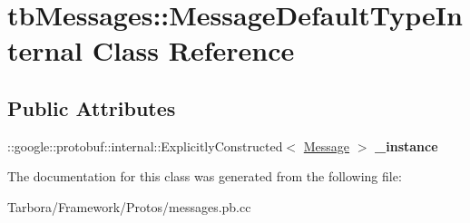 \hypertarget{classtbMessages_1_1MessageDefaultTypeInternal}{}\section{tb\+Messages\+:\+:Message\+Default\+Type\+Internal Class Reference}
\label{classtbMessages_1_1MessageDefaultTypeInternal}
\subsection*{Public Attributes}
\begin{DoxyCompactItemize}
\item 
\mbox{\label{classtbMessages_1_1MessageDefaultTypeInternal_a20227b6832251d2b603f0a722274ff03}} 
\+::google\+::protobuf\+::internal\+::\+Explicitly\+Constructed$<$ \hyperlink{classtbMessages_1_1Message}{Message} $>$ {\bfseries \+\_\+instance}
\end{DoxyCompactItemize}


The documentation for this class was generated from the following file\+:\begin{DoxyCompactItemize}
\item 
Tarbora/\+Framework/\+Protos/messages.\+pb.\+cc\end{DoxyCompactItemize}
